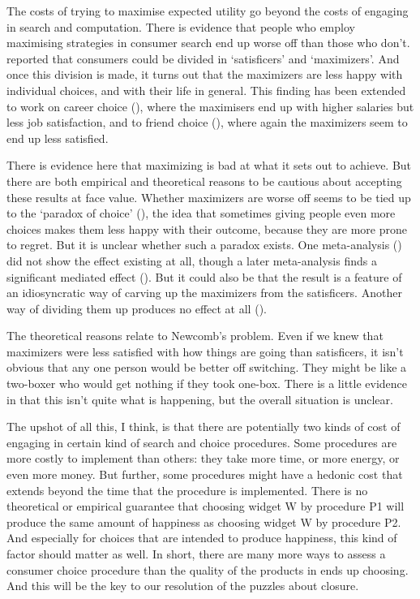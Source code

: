 \documentclass[11pt,]{book}
\begin{document}
The costs of trying to maximise expected utility go beyond the costs of engaging in search and computation. There is evidence that people who employ maximising strategies in consumer search end up worse off than those who don't. \citet{SchwartzEtAl2002} reported that consumers could be divided in `satisficers' and `maximizers'. And once this division is made, it turns out that the maximizers are less happy with individual choices, and with their life in general. This finding has been extended to work on career choice (\citet{IyengarEtAl2006}), where the maximisers end up with higher salaries but less job satisfaction, and to friend choice (\citet{NewmanEtAl2018}), where again the maximizers seem to end up less satisfied.

There is evidence here that maximizing is bad at what it sets out to achieve. But there are both empirical and theoretical reasons to be cautious about accepting these results at face value. Whether maximizers are worse off seems to be tied up to the `paradox of choice' (\citet{Schwartz2004}), the idea that sometimes giving people even more choices makes them less happy with their outcome, because they are more prone to regret. But it is unclear whether such a paradox exists. One meta-analysis (\citet{ScheibehenneEtAl2010}) did not show the effect existing at all, though a later meta-analysis finds a significant mediated effect (\citet{ChernevEtAl2015}). But it could also be that the result is a feature of an idiosyncratic way of carving up the maximizers from the satisficers. Another way of dividing them up produces no effect at all (\citet{DiabEtAl2008}).

The theoretical reasons relate to Newcomb's problem. Even if we knew that maximizers were less satisfied with how things are going than satisficers, it isn't obvious that any one person would be better off switching. They might be like a two-boxer who would get nothing if they took one-box. There is a little evidence in \citet{IyengarEtAl2006} that this isn't quite what is happening, but the overall situation is unclear.

The upshot of all this, I think, is that there are potentially two kinds of cost of engaging in certain kind of search and choice procedures. Some procedures are more costly to implement than others: they take more time, or more energy, or even more money. But further, some procedures might have a hedonic cost that extends beyond the time that the procedure is implemented. There is no theoretical or empirical guarantee that choosing widget W by procedure P1 will produce the same amount of happiness as choosing widget W by procedure P2. And especially for choices that are intended to produce happiness, this kind of factor should matter as well. In short, there are many more ways to assess a consumer choice procedure than the quality of the products in ends up choosing. And this will be the key to our resolution of the puzzles about closure.
\end{document}
